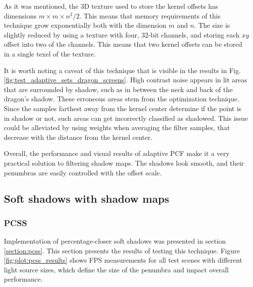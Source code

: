 As it was mentioned, the 3D texture used to store the kernel offsets has dimensions \(m\times m \times n^2/2\). This means that memory requirements of this technique grow exponentially both with the dimension \(m\) and \(n\). The size is slightly reduced by using a texture with four, \(32\)-bit channels, and storing each \(xy\) offset into two of the channels. This means that two kernel offsets can be stored in a single texel of the texture.

It is worth noting a caveat of this technique that is visible in the results in Fig. \ref{fig:test_adaptive_sets_dragon_screens}. High contrast noise appears in lit areas that are surrounded by shadow, such as in between the neck and back of the dragon's shadow. These erroneous areas stem from the optimization technique. Since the samples farthest away from the kernel center determine if the point is in shadow or not, such areas can get incorrectly classified as shadowed. This issue could be alleviated by using weights when averaging the filter samples, that decrease with the distance from the kernel center.

Overall, the performance and visual results of adaptive PCF make it a very practical solution to filtering shadow maps. The shadows look smooth, and their penumbras are easily controlled with the offset scale.

\subsection{Soft shadows with shadow maps}

\subsubsection{PCSS}
Implementation of percentage-closer soft shadows was presented in section \ref{section:pcss}. This section presents the results of testing this technique. Figure \ref{fig:plot:pcss_results} shows FPS measurements for all test scenes with different light source sizes, which define the size of the penumbra and impact overall performance.

